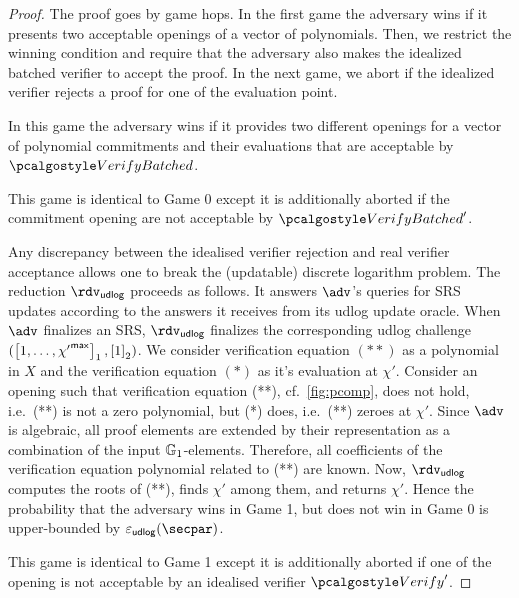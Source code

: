\begin{proof}
 
  The proof goes by game hops. In the first game the adversary wins if it presents two acceptable openings of a vector of polynomials. Then, we restrict the winning condition and require that the adversary also makes the idealized batched verifier to accept the proof. In the next game, we abort if the idealized verifier rejects a proof for one of the evaluation point. 

   In this game the adversary wins if it provides two different openings for a vector of polynomial commitments and their evaluations that are acceptable by $\verifyb$.

   This game is identical to Game 0 except it is additionally aborted if the commitment opening are not acceptable by $\verifyb'$.

  Any discrepancy between the idealised verifier rejection and real verifier acceptance allows one to break the (updatable) discrete logarithm problem.  The reduction $\rdvdulog$ proceeds as follows. It answers $\adv$'s queries for SRS updates according to the answers it receives from its udlog update oracle. When $\adv$ finalizes an SRS, $\rdvdulog$ finalizes the corresponding udlog challenge $(\left[1, \ldots, {\chi'}^{\mathsf{max}}\right]_{1}, \left[1\right]_{2})$. We consider verification equation $(**)$ as a polynomial in $X$ and the verification equation $(*)$ as it's evaluation at $\chi'$. Consider an opening such that verification equation (**), cf.~\cref{fig:pcomp}, does not hold, i.e.~(**) is not a zero polynomial, but (*) does, i.e.~(**) zeroes at $\chi'$. Since $\adv$ is algebraic, all proof elements are extended by their representation as a combination of the input $\mathbb{G}_1$-elements. Therefore, all coefficients of the verification equation polynomial related to (**) are known. Now, $\rdvdulog$ computes the roots of (**), finds $\chi'$ among them, and returns $\chi'$. Hence the probability that the adversary wins in Game 1, but does not win in Game 0 is upper-bounded by $\epsudlog (\secpar)$.

   This game is identical to Game 1 except it is additionally aborted if one of the opening is not acceptable by an idealised verifier $\verify'$.


\end{proof}
